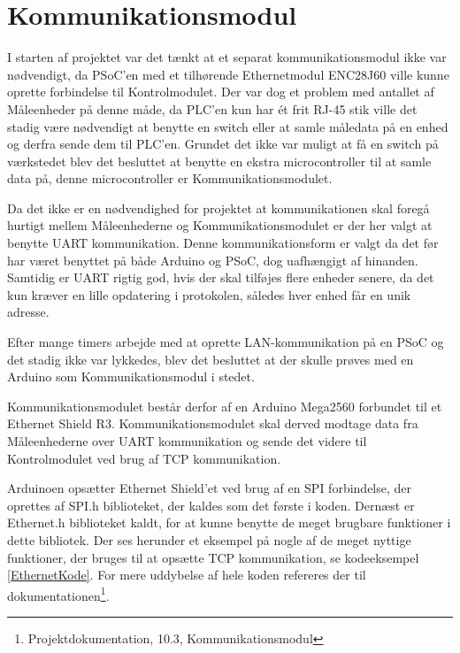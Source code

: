 
\section{Kommunikationsmodul}
\label{Kommunikationsmodul}

I starten af projektet var det tænkt at et separat kommunikationsmodul ikke var nødvendigt, da PSoC'en med et tilhørende Ethernetmodul ENC28J60 ville kunne oprette forbindelse til Kontrolmodulet. Der var dog et problem med antallet af Måleenheder på denne måde, da PLC'en kun har ét frit RJ-45 stik ville det stadig være nødvendigt at benytte en switch eller at samle måledata på en enhed og derfra sende dem til PLC'en. Grundet det ikke var muligt at få en switch på værkstedet blev det besluttet at benytte en ekstra microcontroller til at samle data på, denne microcontroller er Kommunikationsmodulet.   

Da det ikke er en nødvendighed for projektet at kommunikationen skal foregå hurtigt mellem Måleenhederne og Kommunikationsmodulet er der her valgt at benytte UART kommunikation. Denne kommunikationsform er valgt da det før har været benyttet på både Arduino og PSoC, dog uafhængigt af hinanden. Samtidig er UART rigtig god, hvis der skal tilføjes flere enheder senere, da det kun kræver en lille opdatering i protokolen, således hver enhed får en unik adresse.  

Efter mange timers arbejde med at oprette LAN-kommunikation på en PSoC og det stadig ikke var lykkedes, blev det besluttet at der skulle prøves med en Arduino som Kommunikationsmodul i stedet. 

Kommunikationsmodulet består derfor af en Arduino Mega2560 forbundet til et Ethernet Shield R3. Kommunikationsmodulet skal derved modtage data fra Måleenhederne over UART kommunikation og sende det videre til Kontrolmodulet ved brug af TCP kommunikation. 

Arduinoen opsætter Ethernet Shield'et ved brug af en SPI forbindelse, der oprettes af SPI.h biblioteket, der kaldes som det første i koden. Dernæst er Ethernet.h biblioteket kaldt, for at kunne benytte de meget brugbare funktioner i dette bibliotek\cite{Ethernet}. Der ses herunder et eksempel på nogle af de meget nyttige funktioner, der bruges til at opsætte TCP kommunikation, se kodeeksempel \ref{EthernetKode}. For mere uddybelse af hele koden refereres der til dokumentationen\footnote{Projektdokumentation, 10.3, Kommunikationsmodul}.

